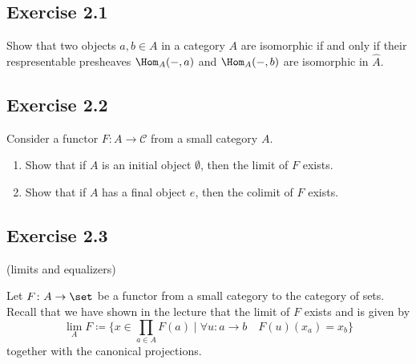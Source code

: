 \subsection{Exercise 2.1}

Show that two objects $ a , b \in A $ in a category $ A $ are isomorphic if and only if their respresentable presheaves $ \Hom_A ( - , a ) $ and $ \Hom_A ( -, b ) $ are isomorphic in $ \widehat{ A } $.

\subsection{Exercise 2.2}

Consider a functor $ F \colon A  \to \mathcal{ C } $ from a small category $A$.

\begin{enumerate}
    \item 
    Show that if $ A $ is an initial object $ \emptyset $, then the limit of $ F $ exists.

    \item 
    Show that if $ A $ has a final object $ e $, then the colimit of $ F $ exists.
\end{enumerate}

\subsection{Exercise 2.3}{ (limits and equalizers)}

Let $ F \colon A \to \set $ be a functor from a small category to the category of sets.
Recall that we have shown in the lecture that the limit of $ F $ exists and is given by 
\[
    \lim_A F \coloneqq \bigg\{ x \in \prod_{ a \in A } F ( a ) \mid \forall u \colon a \to b \quad F ( u ) ( x_a ) = x_b \bigg\}
\]
together with the canonical projections.

